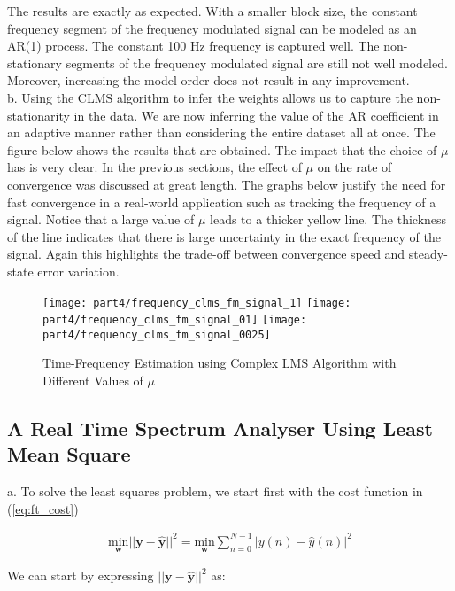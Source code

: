 \noindent{}The results are exactly as expected. With a smaller block size, the constant frequency segment of the frequency modulated signal can be modeled as an AR(1) process. The constant 100 Hz frequency is captured well. The non-stationary segments of the frequency modulated signal are still not well modeled. Moreover, increasing the model order does not result in any improvement. \\

\noindent{}b. Using the CLMS algorithm to infer the weights allows us to capture the non-stationarity in the data. We are now inferring the value of the AR coefficient in an adaptive manner rather than considering the entire dataset all at once. The figure below shows the results that are obtained. The impact that the choice of $\mu$ has is very clear. In the previous sections, the effect of $\mu$ on the rate of convergence was discussed at great length. The graphs below justify the need for fast convergence in a real-world application such as tracking the frequency of a signal. Notice that a large value of $\mu$ leads to a thicker yellow line. The thickness of the line indicates that there is large uncertainty in the exact frequency of the signal. Again this highlights the trade-off between convergence speed and steady-state error variation.

\begin{figure}[H]
\centering{}
\texttt{[image: part4/frequency\_clms\_fm\_signal\_1]}
\texttt{[image: part4/frequency\_clms\_fm\_signal\_01]}
\texttt{[image: part4/frequency\_clms\_fm\_signal\_0025]}
\caption{Time-Frequency Estimation using Complex LMS Algorithm with Different Values of $\mu$}
\end{figure}

\subsection{A Real Time Spectrum Analyser Using Least Mean Square}

\noindent{}a. To solve the least squares problem, we start first with the cost function in (\ref{eq:ft_cost})

\begin{align}
\underset{\textbf{w}}{\text{min}} ||\textbf{y}-\hat{\textbf{y}}||^2 =  \underset{\textbf{w}}{\text{min}} \sum_{n=0}^{N-1}|y(n)-\hat{y}(n)|^2\label{eq:ft_cost}
\end{align}

\noindent{}We can start by expressing $||\textbf{y}-\hat{\textbf{y}}||^2$ as:

